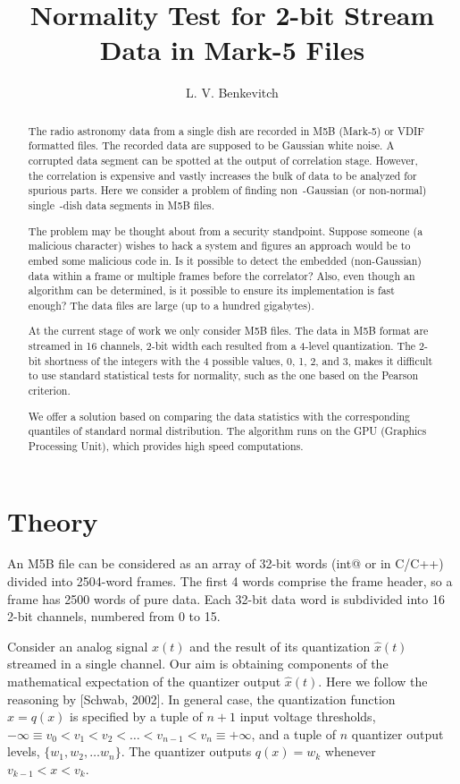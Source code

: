 \documentclass[letterpaper,twoside,12pt]{article}
\title{Normality Test for 2-bit Stream Data in Mark-5 Files}
\author[1]{L. V. Benkevitch}
\affil[1]{\small MIT Haystack observatory, Westford, MA 01886, USA.}
\begin{document}
\maketitle

\begin{abstract}
The radio astronomy data from a single dish are recorded in M5B (Mark-5) or VDIF formatted files. The recorded data are supposed to be Gaussian white noise. A corrupted data segment can be spotted at the output of correlation stage. However, the correlation is expensive and vastly increases the bulk of data to be analyzed for spurious parts. Here we consider a problem of finding non~-Gaussian (or non-normal) single~-dish data segments in M5B files.

The problem may be thought about from a security standpoint. Suppose someone (a malicious character) wishes to hack a system and figures an approach would be to embed some malicious code in. Is it possible to detect the embedded (non-Gaussian) data within a frame or multiple frames before the correlator? Also, even though an algorithm can be determined, is it possible to ensure its implementation is fast enough? The data files are large (up to a hundred gigabytes).

At the current stage of work we only consider M5B files. The data in M5B format are streamed in 16 channels, 2-bit width each resulted from a 4-level quantization. The 2-bit shortness of the integers with the 4 possible values, 0, 1, 2, and 3, makes it difficult to use standard statistical tests for normality, such as the one based on the Pearson criterion.     
 
We offer a solution based on comparing the data statistics with the corresponding quantiles of standard normal distribution. The algorithm runs on the GPU (Graphics Processing Unit), which provides high speed computations.
\end{abstract}


\section{Theory}

An M5B file can be considered as an array of 32-bit words (\verb@unsigned int@ or  \verb@uint@ in C/C++) divided into 2504-word frames. The first 4 words comprise the frame header, so a frame has 2500 words of pure data. Each 32-bit data word is subdivided into 16 2-bit channels, numbered from 0 to 15. 

Consider an analog signal $x(t)$ and the result of its quantization $\hat{x}(t)$ streamed in a single channel. Our aim is obtaining components of the mathematical expectation of the quantizer output $\hat{x}(t)$. Here we follow the reasoning by [Schwab, 2002]. In general case, the quantization function $\hat{x} = q(x)$ is specified by a tuple of $n+1$ input voltage thresholds, 
$-\infty \equiv v_0 < v_1 < v_2 < \ldots  < v_{n-1} < v_n \equiv +\infty$, and a tuple of $n$ quantizer output levels, $\{ w_1, w_2, \ldots w_n \}$. The quantizer outputs $q(x) = w_k$ whenever $v_{k-1} < x < v_k$.
\end{document}
